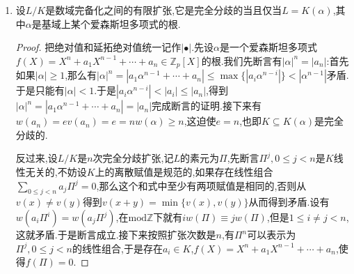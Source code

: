 \begin{enumerate}
\begin{itemize}
\begin{proof}
    		\qquad
    		
    		按照$(n,p)=1$,有多项式$X^n-1$在$B$中分裂为不同一次因式的乘积,并且它在$\lambda$中也分裂为不同一次因式的乘积.于是$\lambda=\mathbb{F}_{q^f}$包含了$n$次单位根,并且由$n$次本原单位根生成,于是$f$是最小的自然数使得$n$次本原单位根落在$\mathbb{F}^*_{q^f}$,也即最小的自然数$f$使得$n\mid q^f-1$.
    	\end{proof}
    	\item 扩张$K\subseteq L$的自同构群同构于$G(\lambda/\kappa)$,并且它被$\varphi:\zeta\mapsto\zeta^q$生成.这由上一条直接得到,因为上一条证明了扩张$K\subseteq L$的生成元$\zeta$的极小多项式也是$\mathbb{F}_q\subset\mathbb{F}_{q^f}$的极小多项式,于是Galois群由$\zeta\mapsto\zeta^q$生成.
    	\item $B=A[\zeta]$.
    	\begin{proof}
    		
    		按照$K\subseteq L$是非分歧扩张,那么$mB=n$,其中$m$和$n$分别是$A$和$B$的唯一极大理想.另外按照$\{1,\zeta,\zeta^2,\cdots,\zeta^{f-1}\}$是$\kappa\subset\lambda$的一组基,于是$B=A[\zeta]+mB$,按照NAK引理,得到$B=A[\zeta]$.
    	\end{proof}
    \end{itemize}
    \item 设$L/K$是数域完备化之间的有限扩张,它是完全分歧的当且仅当$L=K(\alpha)$,其中$\alpha$是基域上某个爱森斯坦多项式的根.
    \begin{proof}
    	
    	把绝对值和延拓绝对值统一记作$|\bullet|$.先设$\alpha$是一个爱森斯坦多项式$f(X)=X^n+a_1X^{n-1}+\cdots+a_n\in\mathbb{Z}_p[X]$的根.我们先断言有$|\alpha|^n=|a_n|$:首先如果$|\alpha|\ge1$,那么有$|\alpha|^n=|a_1\alpha^{n-1}+\cdots+a_n|\le\max\{|a_i\alpha^{n-i}|\}<|\alpha^{n-1}|$矛盾.于是只能有$|\alpha|<1$.于是$|a_i\alpha^{n-i}|<|a_i|\le|a_n|$,得到$|\alpha|^n=|a_1\alpha^{n-1}+\cdots+a_n|=|a_n|$完成断言的证明.接下来有$w(a_n)=ev(a_n)=e=nw(\alpha)\ge n$,这迫使$e=n$,也即$K\subseteq K(\alpha)$是完全分歧的.
    	
    	\qquad
    	
    	反过来,设$L/K$是$n$次完全分歧扩张,记$L$的素元为$\Pi$,先断言$\Pi^j,0\le j<n$是$K$线性无关的,不妨设$K$上的离散赋值是规范的,如果存在线性组合$\sum_{0\le j<n}a_j\Pi^j=0$,那么这个和式中至少有两项赋值是相同的,否则从$v(x)\not=v(y)$得到$v(x+y)=\min\{v(x),v(y)\}$从而得到矛盾.设有$w(a_i\Pi^i)=w(a_j\Pi^j)$,在$\mathrm{mod}\mathbb{Z}$下就有$iw(\Pi)\equiv jw(\Pi)$,但是$1\le i\not=j<n$,这就矛盾.于是断言成立.接下来按照扩张次数是$n$,有$\Pi^n$可以表示为$\Pi^j,0\le j<n$的线性组合,于是存在$a_i\in K$,$f(X)=X^n+a_1X^{n-1}+\cdots+a_n$,使得$f(\Pi)=0$.
    	

\end{proof}
\end{enumerate}

